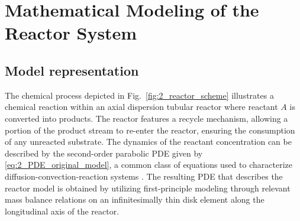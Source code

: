 \section{Mathematical Modeling of the Reactor System}

\subsection{Model representation}

The chemical process depicted in Fig.~\ref{fig:2_reactor_scheme} illustrates a chemical reaction within an axial dispersion tubular reactor \cite{levenspiel1998chemical} where reactant $A$ is converted into products. The reactor features a recycle mechanism, allowing a portion of the product stream to re-enter the reactor, ensuring the consumption of any unreacted substrate. The dynamics of the reactant concentration can be described by the second-order parabolic PDE given by \eqref{eq:2_PDE_original_model}, a common class of equations used to characterize diffusion-convection-reaction systems \cite{jensen1982bifurcation}. The resulting PDE that describes the reactor model is obtained by utilizing first-principle modeling through relevant mass balance relations on an infinitesimally thin disk element along the longitudinal axis of the reactor.


